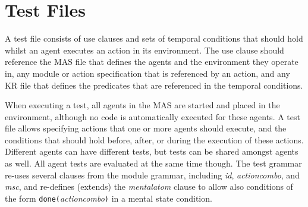 \documentclass{article}
\begin{document}
%
%
\section{Test Files}
%

\newcommand{\timeout}{\texttt{timeout}\xspace}
\newcommand{\test}{\texttt{test}\xspace}
\newcommand{\inp}{\texttt{in}\xspace}
\newcommand{\eventually}{\texttt{eventually}\xspace}
\newcommand{\until}{\texttt{until}\xspace}
\newcommand{\reactto}{\texttt{reactTo}}
\newcommand{\done}{\texttt{done}}

A test file consists of use clauses and sets of temporal conditions that should hold whilst an agent executes an action in its environment. The use clause should reference the MAS file that defines the agents and the environment they operate in, any module or action specification that is referenced by an action, and any KR file that defines the predicates that are referenced in the temporal conditions.

When executing a test, all agents in the MAS are started and placed in the environment, although no code is automatically executed for these agents. A test file allows specifying actions that one or more agents should execute, and the conditions that should hold before, after, or during the execution of these actions. Different agents can have different tests, but tests can be shared amongst agents as well. All agent tests are evaluated at the same time though. The test grammar re-uses several clauses from the module grammar, including \textit{id}, \textit{actioncombo}, and \textit{msc}, and re-defines (extends) the \textit{mentalatom} clause to allow also conditions of the form \done\texttt{(}\textit{actioncombo}\texttt{)} in a mental state condition.
\end{document}
